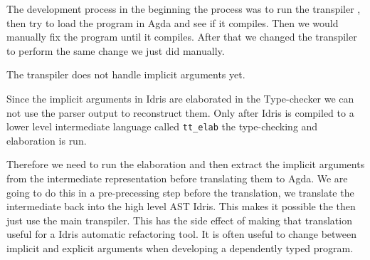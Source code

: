 The development process in the beginning the process was to run the transpiler
, then try to load the program in Agda and see if it compiles.  Then we would
manually fix the program until it compiles.  After that we changed the
transpiler to perform the same change we just did manually.


The transpiler does not handle implicit arguments yet.

Since the implicit arguments in Idris are elaborated in the Type-checker we can
not use the parser output to reconstruct them.
Only after Idris is compiled to a lower level intermediate
language called \texttt{tt\_elab} the type-checking and elaboration is
run.

Therefore we need to run the elaboration and then extract the implicit
arguments from the intermediate representation before translating them to
Agda.  We are going to do this in a pre-precessing step before the translation,
we translate the intermediate back into the high level AST Idris. This makes it
possible the then just use the main transpiler.  This has the side effect of
making that translation useful for a Idris automatic refactoring tool. It is
often useful to change between implicit and explicit arguments when developing
a dependently typed program.





